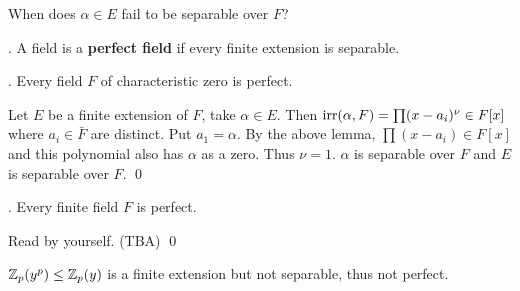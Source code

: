 When does \(\alpha \in E\) fail to be separable over \(F\)?

.  A field is a \textbf{perfect field} if every finite extension is separable.

\thm. Every field \(F\) of characteristic zero is perfect.

\pf Let \(E\) be a finite extension of \(F\), take \(\alpha \in E\). Then \(\mathrm{irr}(\alpha, F) = \prod (x - a_i)^\nu \in F[x]\) where \(a_i \in \bar{F}\) are distinct. Put \(a_1 = \alpha\). By the above lemma, \(\prod (x - a_i) \in F[x]\) and this polynomial also has \(\alpha\) as a zero. Thus \(\nu = 1\). \(\alpha\) is separable over \(F\) and \(E\) is separable over \(F\). \qed

\thm. Every finite field \(F\) is perfect.

\pf Read by yourself. (TBA) \qed

\rmk \(\mathbb{Z}_p(y^p) \leq \mathbb{Z}_p(y)\) is a finite extension but not separable, thus not perfect.
